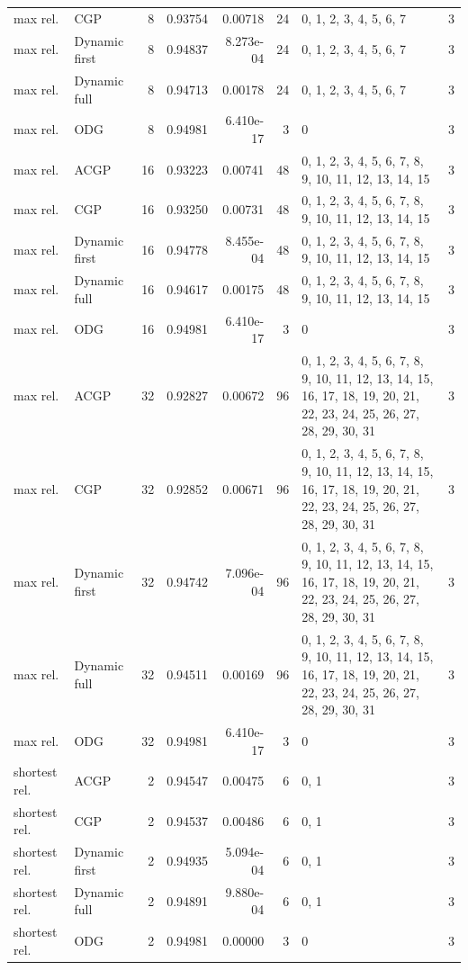 \documentclass[10pt,a4paper]{article}
\begin{document}
\begin{longtable}{@{}p{23mm}p{29mm}rrrrp{36mm}r@{}}
max rel. & CGP & 8 & 0.93754 & 0.00718 & 24 & 0, 1, 2, 3, 4, 5, 6, 7 & 3 \\
max rel. & Dynamic first & 8 & 0.94837 & 8.273e-04 & 24 & 0, 1, 2, 3, 4, 5, 6, 7 & 3 \\
max rel. & Dynamic full & 8 & 0.94713 & 0.00178 & 24 & 0, 1, 2, 3, 4, 5, 6, 7 & 3 \\
max rel. & ODG & 8 & 0.94981 & 6.410e-17 & 3 & 0 & 3 \\
max rel. & ACGP & 16 & 0.93223 & 0.00741 & 48 & 0, 1, 2, 3, 4, 5, 6, 7, 8, 9, 10, 11, 12, 13, 14, 15 & 3 \\
max rel. & CGP & 16 & 0.93250 & 0.00731 & 48 & 0, 1, 2, 3, 4, 5, 6, 7, 8, 9, 10, 11, 12, 13, 14, 15 & 3 \\
max rel. & Dynamic first & 16 & 0.94778 & 8.455e-04 & 48 & 0, 1, 2, 3, 4, 5, 6, 7, 8, 9, 10, 11, 12, 13, 14, 15 & 3 \\
max rel. & Dynamic full & 16 & 0.94617 & 0.00175 & 48 & 0, 1, 2, 3, 4, 5, 6, 7, 8, 9, 10, 11, 12, 13, 14, 15 & 3 \\
max rel. & ODG & 16 & 0.94981 & 6.410e-17 & 3 & 0 & 3 \\
max rel. & ACGP & 32 & 0.92827 & 0.00672 & 96 & 0, 1, 2, 3, 4, 5, 6, 7, 8, 9, 10, 11, 12, 13, 14, 15, 16, 17, 18, 19, 20, 21, 22, 23, 24, 25, 26, 27, 28, 29, 30, 31 & 3 \\
max rel. & CGP & 32 & 0.92852 & 0.00671 & 96 & 0, 1, 2, 3, 4, 5, 6, 7, 8, 9, 10, 11, 12, 13, 14, 15, 16, 17, 18, 19, 20, 21, 22, 23, 24, 25, 26, 27, 28, 29, 30, 31 & 3 \\
max rel. & Dynamic first & 32 & 0.94742 & 7.096e-04 & 96 & 0, 1, 2, 3, 4, 5, 6, 7, 8, 9, 10, 11, 12, 13, 14, 15, 16, 17, 18, 19, 20, 21, 22, 23, 24, 25, 26, 27, 28, 29, 30, 31 & 3 \\
max rel. & Dynamic full & 32 & 0.94511 & 0.00169 & 96 & 0, 1, 2, 3, 4, 5, 6, 7, 8, 9, 10, 11, 12, 13, 14, 15, 16, 17, 18, 19, 20, 21, 22, 23, 24, 25, 26, 27, 28, 29, 30, 31 & 3 \\
max rel. & ODG & 32 & 0.94981 & 6.410e-17 & 3 & 0 & 3 \\
shortest rel. & ACGP & 2 & 0.94547 & 0.00475 & 6 & 0, 1 & 3 \\
shortest rel. & CGP & 2 & 0.94537 & 0.00486 & 6 & 0, 1 & 3 \\
shortest rel. & Dynamic first & 2 & 0.94935 & 5.094e-04 & 6 & 0, 1 & 3 \\
shortest rel. & Dynamic full & 2 & 0.94891 & 9.880e-04 & 6 & 0, 1 & 3 \\
shortest rel. & ODG & 2 & 0.94981 & 0.00000 & 3 & 0 & 3 \\

\end{longtable}
\end{document}
